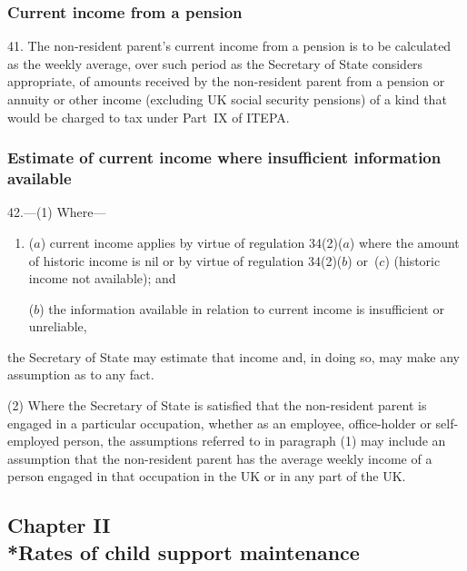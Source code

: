 \documentclass[12pt,a4paper]{article}
\begin{document}
\subsubsection[41. Current income from a pension]{Current income from a pension}

41.  The non-resident parent’s current income from a pension is to be calculated as the weekly average, over such period as the Secretary of State considers appropriate, of amounts received by the non-resident parent from a pension or annuity or other income (excluding UK social security pensions) of a kind that would be charged to tax under Part~IX of ITEPA.

\subsubsection[42. Estimate of current income where insufficient information available]{Estimate of current income where insufficient information available}

42.---(1)  Where—
\begin{enumerate}\item[]
($a$) current income applies by virtue of 
regulation 34(2)($a$)  where the amount of historic income is nil or by virtue of  %
regulation 34(2)($b$)  
or~($c$)  %
(historic income 
not available); and

($b$) the information available in relation to current income is insufficient or unreliable,
\end{enumerate}
the Secretary of State may estimate that income and, in doing so, may make any assumption as to any fact.

(2) Where the Secretary of State is satisfied that the non-resident parent is engaged in a particular occupation, whether as an employee, office-holder or self-employed person, the assumptions referred to in paragraph (1) may include an assumption that the non-resident parent has the average weekly income of a person engaged in that occupation in the UK or in any part of the UK.


\subsection[Chapter II --- Rates of child support maintenance]{Chapter II\\*Rates of child support maintenance}
\end{document}
